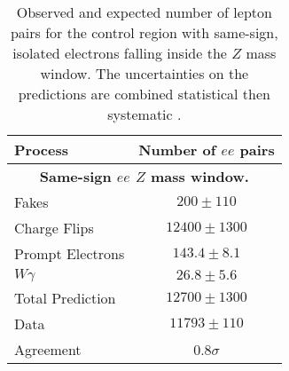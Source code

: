 \begin{table}[htbp]
\caption{Observed and expected number of lepton pairs for the control region with same-sign, isolated electrons falling inside the $Z$ mass window. The uncertainties on the predictions are combined statistical then systematic .}
\begin{center}
\begin{tabular}{l|c}
\hline
Process & Number of $ee$ pairs \\\hline\hline
%
\multicolumn{2}{c}{\textbf{Same-sign $ee$ $Z$ mass window.}} \\\hline 
        Fakes      & $200 \pm 110$ \\[+0.05in]
        Charge Flips & $12400 \pm 1300$ \\[+0.05in]
        Prompt Electrons & $143.4 \pm 8.1$ \\[+0.05in]
        $W\gamma$  & $26.8 \pm 5.6$ \\[+0.05in]
            \hline
        Total Prediction & $12700 \pm 1300$ \\[+0.05in]
            \hline
        Data       &       $11793 \pm 110$ \\[+0.05in]
            \hline
        Agreement  &      0.8$\sigma$ \\[+0.05in]
%
\hline 
\end{tabular}
\end{center}
\label{tab:ee_isoSS_Z}
\end{table}




